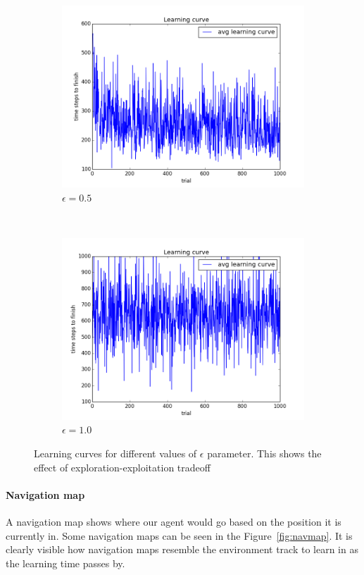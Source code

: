 \begin{figure}[h!]
\begin{subfigure}[b]{0.4\textwidth}
    \includegraphics[width=\textwidth]{figures/epsilon_5_learning_curve.png}
    \caption{\label{fig:eps5}$\epsilon = 0.5$}
\end{subfigure}
~
\begin{subfigure}[b]{0.4\textwidth}
    \includegraphics[width=\textwidth]{figures/epsilon_10_learning_curve.png}
    \caption{\label{fig:eps10}$\epsilon = 1.0$}
\end{subfigure}
\caption{\label{fig:eps}Learning curves for different values of $\epsilon$
parameter. This shows the effect of exploration-exploitation tradeoff}
\end{figure}
 

\paragraph{Navigation map}
A navigation map shows where our agent would go based on the position it is
currently in. Some navigation maps can be seen in the Figure~\ref{fig:navmap}.
It is clearly visible how navigation maps resemble the environment track to
learn in as the learning time passes by.

